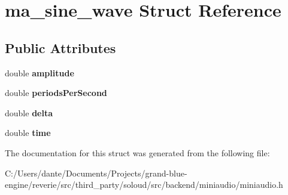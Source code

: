 \hypertarget{structma__sine__wave}{}\section{ma\+\_\+sine\+\_\+wave Struct Reference}
\label{structma__sine__wave}
\subsection*{Public Attributes}
\begin{DoxyCompactItemize}
\item 
\mbox{\label{structma__sine__wave_a62d5e009a1ad644e24406dcc0751a119}} 
double {\bfseries amplitude}
\item 
\mbox{\label{structma__sine__wave_a86259617479ae5d8974560c97f31b9fb}} 
double {\bfseries periods\+Per\+Second}
\item 
\mbox{\label{structma__sine__wave_a8ff9dff613b885f22cf0e2eec7792ff0}} 
double {\bfseries delta}
\item 
\mbox{\label{structma__sine__wave_ab9e9ca5ec994c6850d89a3379b18bb0e}} 
double {\bfseries time}
\end{DoxyCompactItemize}


The documentation for this struct was generated from the following file\+:\begin{DoxyCompactItemize}
\item 
C\+:/\+Users/dante/\+Documents/\+Projects/grand-\/blue-\/engine/reverie/src/third\+\_\+party/soloud/src/backend/miniaudio/miniaudio.\+h\end{DoxyCompactItemize}
